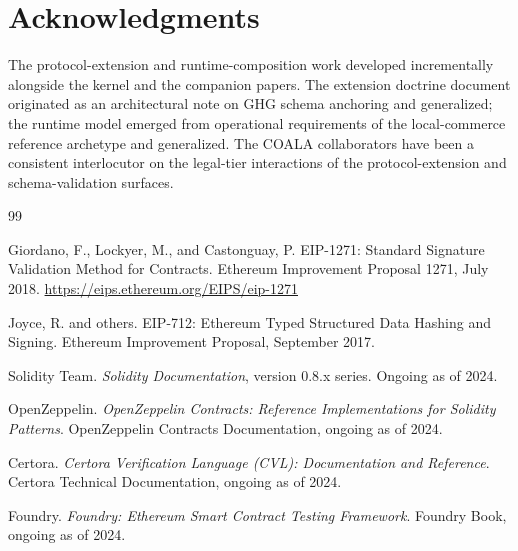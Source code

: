 \documentclass[11pt,a4paper]{article}
\theoremstyle{definition}
\theoremstyle{remark}
\begin{document}
\section*{Acknowledgments}
The protocol-extension and runtime-composition work developed
incrementally alongside the kernel and the companion papers. The
extension doctrine document originated as an architectural note on
GHG schema anchoring and generalized; the runtime model emerged
from operational requirements of the local-commerce reference
archetype and generalized. The COALA collaborators have been a
consistent interlocutor on the legal-tier interactions of the
protocol-extension and schema-validation surfaces.

\begin{thebibliography}{99}

Giordano, F., Lockyer, M., and Castonguay, P.
\newblock EIP-1271: Standard Signature Validation Method for
  Contracts.
\newblock Ethereum Improvement Proposal 1271, July 2018.
\newblock \url{https://eips.ethereum.org/EIPS/eip-1271}

Joyce, R. and others.
\newblock EIP-712: Ethereum Typed Structured Data Hashing and
  Signing.
\newblock Ethereum Improvement Proposal, September 2017.

Solidity Team.
\newblock \emph{Solidity Documentation}, version 0.8.x series.
\newblock Ongoing as of 2024.

OpenZeppelin.
\newblock \emph{OpenZeppelin Contracts: Reference Implementations
  for Solidity Patterns}.
\newblock OpenZeppelin Contracts Documentation, ongoing as of 2024.

Certora.
\newblock \emph{Certora Verification Language (CVL): Documentation
  and Reference}.
\newblock Certora Technical Documentation, ongoing as of 2024.

Foundry.
\newblock \emph{Foundry: Ethereum Smart Contract Testing Framework}.
\newblock Foundry Book, ongoing as of 2024.

\end{thebibliography}
\end{document}
